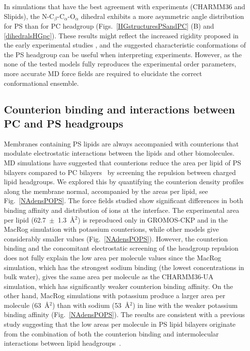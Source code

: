 \documentclass[journal=jpcbfk,manuscript=article]{achemso}
\begin{document}
In simulations that have the best agreement with experiments (CHARMM36 and Slipids),
the N-C$_\beta$-C$_\alpha$-O$_\alpha$ dihedral exhibits a more asymmetric
angle distribution for PS than for PC headgroup (Figs.~\ref{HGstructuresPSandPC} (B) and \ref{dihedralsHGpc}).
These results might reflect the increased rigidity proposed in the early experimental studies \cite{browning80,buldt81}, and the suggested characteristic conformations of the PS headgroup can be useful when interpreting experiments. However, as the none of the tested models fully reproduces the experimental order parameters, more accurate MD force fields are required to elucidate the correct conformational ensemble.

\subsection{Counterion binding and interactions between PC and PS headgroups}\label{ciBINDINGsection}

Membranes containing PS lipids are always accompanied with counterions that
modulate electrostatic interactions between the lipids and other biomolecules. MD simulations have suggested
that counterions reduce the area per lipid of PS bilayers compared to PC
bilayers~\cite{pandit02,mukhopadhyay04,pedersen06} by screening the repulsion between charged lipid headgroups.
We explored this by quantifying the counterion density profiles along the membrane normal, accompanied by the areas per lipid, see Fig.~\ref{NAdensPOPS}.
The force fields studied show significant differences in both binding affinity
and distribution of ions at the interface.
The experimental area per lipid (62.7~$\pm$~1.3~\AA$^2$) \cite{pan14} 
is reproduced only in GROMOS-CKP and in the MacRog simulation
with potassium counterions, while other models give considerably smaller values (Fig.~\ref{NAdensPOPS}).
However, the counterion binding and the concomitant electrostatic screening of the headgroup
repulsion does not fully explain the low area per molecule values
since the MacRog simulation, which has the strongest sodium binding
(the lowest concentrations in bulk water), gives the same area per molecule
as the CHARMM36-UA simulation, which has significantly weaker counterion binding
affinity. On the other hand, MacRog simulations with potassium produce a larger area per molecule (63~\AA$^2$) than
with sodium (53~\AA$^2$) in line with the weaker potassium binding affinity (Fig.~\ref{NAdensPOPS}).
The results are consistent with a previous study suggesting that the
low areas per molecule in PS lipid bilayers originate from the combination
of both the counterion binding and intermolecular interactions between lipid headgroups~\cite{petrache04}.
\end{document}
